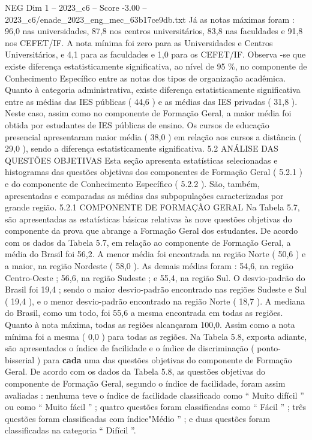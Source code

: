 \begin{textsample}{NEG Dim 1 – 2023\_c6 – Score -3.00 – 2023\_c6/enade\_2023\_eng\_mec\_63b17ce9db.txt}
Já as notas máximas foram : 96,0 nas universidades, 87,8 nos centros universitários, 83,8 nas faculdades e 91,8 nos CEFET/IF.
A nota mínima foi zero para as Universidades e Centros Universitários, e 4,1 para as faculdades e 1,0 para os CEFET/IF.
Observa -se que existe diferença estatisticamente significativa, ao nível de 95 \%, no componente de Conhecimento Específico entre as notas dos tipos de organização acadêmica.
Quanto à categoria administrativa, existe diferença estatisticamente significativa entre as médias das IES públicas ( 44,6 ) e as médias das IES privadas ( 31,8 ).
Neste caso, assim como no componente de Formação Geral, a maior média foi obtida por estudantes de IES públicas de ensino.
Os cursos de educação presencial apresentaram maior média ( 38,0 ) em relação aos cursos a distância ( 29,0 ), sendo a diferença estatisticamente significativa. 5.2 ANÁLISE DAS QUESTÕES OBJETIVAS Esta seção apresenta estatísticas selecionadas e histogramas das questões objetivas dos componentes de Formação Geral ( 5.2.1 ) e do componente de Conhecimento Específico ( 5.2.2 ).
São, também, apresentadas e comparadas as médias das subpopulações caracterizadas por grande região. 5.2.1 COMPONENTE DE FORMAÇÃO GERAL Na Tabela 5.7, são apresentadas as estatísticas básicas relativas às nove questões objetivas do componente da prova que abrange a Formação Geral dos estudantes.
De acordo com os dados da Tabela 5.7, em relação ao componente de Formação Geral, a média do Brasil foi 56,2.
A menor média foi encontrada na região Norte ( 50,6 ) e a maior, na região Nordeste ( 58,0 ).
As demais médias foram : 54,6, na região Centro-Oeste ; 56,6, na região Sudeste ; e 55,4, na região Sul.
O desvio-padrão do Brasil foi 19,4 ; sendo o maior desvio-padrão encontrado nas regiões Sudeste e Sul ( 19,4 ), e o menor desvio-padrão encontrado na região Norte ( 18,7 ).
A mediana do Brasil, como um todo, foi 55,6 a mesma encontrada em todas as regiões.
Quanto à nota máxima, todas as regiões alcançaram 100,0.
Assim como a nota mínima foi a mesma ( 0,0 ) para todas as regiões.
Na Tabela 5.8, exposta adiante, são apresentados o índice de facilidade e o índice de discriminação ( ponto-bisserial ) para \textbf{cada} uma das questões objetivas do componente de Formação Geral.
De acordo com os dados da Tabela 5.8, as questões objetivas do componente de Formação Geral, segundo o índice de facilidade, foram assim avaliadas : nenhuma teve o índice de facilidade classificado como “ Muito difícil ” ou como “ Muito fácil ” ; quatro questões foram classificadas como “ Fácil ” ; três questões foram classificadas com índice"Médio ” ; e duas questões foram classificadas na categoria “ Difícil ”.

\end{textsample}
